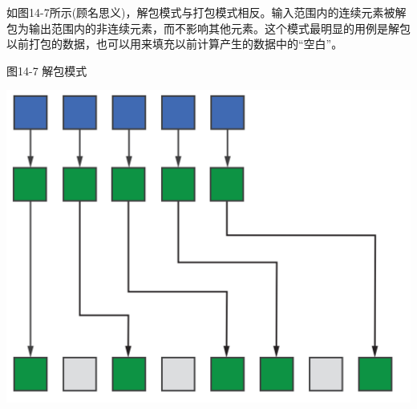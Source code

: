 如图14-7所示(顾名思义)，解包模式与打包模式相反。输入范围内的连续元素被解包为输出范围内的非连续元素，而不影响其他元素。这个模式最明显的用例是解包以前打包的数据，也可以用来填充以前计算产生的数据中的“空白”。\par

\hspace*{\fill} \par %
图14-7 解包模式
\begin{center}
	\includegraphics[width=1.\textwidth]{content/chapter-14/images/7}
\end{center}


















